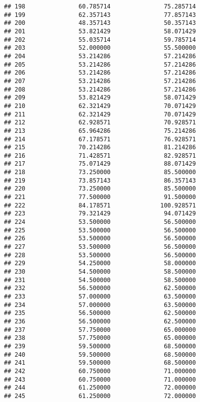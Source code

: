 \documentclass[]{article}
\begin{document}
\begin{verbatim}
## 198               60.785714               75.285714
## 199               62.357143               77.857143
## 200               48.357143               50.357143
## 201               53.821429               58.071429
## 202               55.035714               59.785714
## 203               52.000000               55.500000
## 204               53.214286               57.214286
## 205               53.214286               57.214286
## 206               53.214286               57.214286
## 207               53.214286               57.214286
## 208               53.214286               57.214286
## 209               53.821429               58.071429
## 210               62.321429               70.071429
## 211               62.321429               70.071429
## 212               62.928571               70.928571
## 213               65.964286               75.214286
## 214               67.178571               76.928571
## 215               70.214286               81.214286
## 216               71.428571               82.928571
## 217               75.071429               88.071429
## 218               73.250000               85.500000
## 219               73.857143               86.357143
## 220               73.250000               85.500000
## 221               77.500000               91.500000
## 222               84.178571              100.928571
## 223               79.321429               94.071429
## 224               53.500000               56.500000
## 225               53.500000               56.500000
## 226               53.500000               56.500000
## 227               53.500000               56.500000
## 228               53.500000               56.500000
## 229               54.250000               58.000000
## 230               54.500000               58.500000
## 231               54.500000               58.500000
## 232               56.500000               62.500000
## 233               57.000000               63.500000
## 234               57.000000               63.500000
## 235               56.500000               62.500000
## 236               56.500000               62.500000
## 237               57.750000               65.000000
## 238               57.750000               65.000000
## 239               59.500000               68.500000
## 240               59.500000               68.500000
## 241               59.500000               68.500000
## 242               60.750000               71.000000
## 243               60.750000               71.000000
## 244               61.250000               72.000000
## 245               61.250000               72.000000

\end{verbatim}
\end{document}
